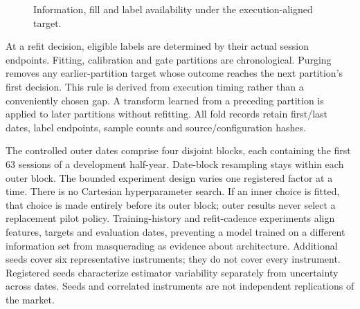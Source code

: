 \documentclass[11pt,a4paper]{article}
\begin{document}
\begin{figure}[htbp]\centering

\caption{Information, fill and label availability under the execution-aligned target.}\label{fig:3}
\end{figure}

At a refit decision, eligible labels are determined by their actual session endpoints. Fitting, calibration and gate partitions are chronological. Purging removes any earlier-partition target whose outcome reaches the next partition's first decision. This rule is derived from execution timing rather than a conveniently chosen gap. A transform learned from a preceding partition is applied to later partitions without refitting. All fold records retain first/last dates, label endpoints, sample counts and source/configuration hashes.

The controlled outer dates comprise four disjoint blocks, each containing the first 63 sessions of a development half-year. Date-block resampling stays within each outer block. The bounded experiment design varies one registered factor at a time. There is no Cartesian hyperparameter search. If an inner choice is fitted, that choice is made entirely before its outer block; outer results never select a replacement pilot policy. Training-history and refit-cadence experiments align features, targets and evaluation dates, preventing a model trained on a different information set from masquerading as evidence about architecture. Additional seeds cover six representative instruments; they do not cover every instrument. Registered seeds characterize estimator variability separately from uncertainty across dates. Seeds and correlated instruments are not independent replications of the market.
\end{document}
